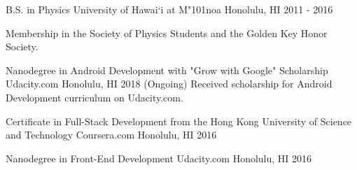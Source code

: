 \begin{cventries}

	\cventry
	{B.S. in Physics}
	{University of Hawai`i at M{\char"101}noa}
	{Honolulu, HI}
	{2011 - 2016}
	{
	  \begin{cvitems}
	    \item {Membership in the Society of Physics Students and the Golden Key Honor Society.}
	  \end{cvitems}
	}

	\cventry
	{Nanodegree in Android Development with "Grow with Google" Scholarship}
	{Udacity.com}
	{Honolulu, HI}
	{2018 (Ongoing)}
	{Received scholarship for Android Development curriculum on Udacity.com.}  

	\cventry
	{Certificate in Full-Stack Development from the Hong Kong University of Science and Technology}
	{Coursera.com}
	{Honolulu, HI}
	{2016}
	{}  
	
	\cventry
	{Nanodegree in Front-End Development}
	{Udacity.com}
	{Honolulu, HI}
	{2016}
	{}    
\end{cventries}
